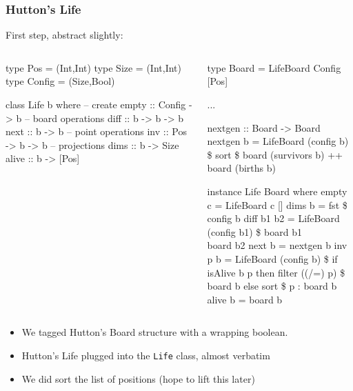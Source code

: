 \documentclass[smaller]{beamer}
\begin{document}
\begin{frame}[fragile]
\frametitle{Hutton's Life}
First step, abstract slightly:

\begin{columns}
\begin{column}{0.5\textwidth}

\begin{codeblock}
\tiny
\begin{semiverbatim}
type Pos = (Int,Int)
type Size = (Int,Int)
type Config = (Size,Bool)

class Life b where
        -- create
        empty :: Config -> b
        -- board operations
        diff :: b -> b -> b
        next :: b -> b
        -- point operations
        inv :: Pos -> b -> b
        -- projections
        dims :: b -> Size
        alive :: b -> [Pos]
\end{semiverbatim}
\end{codeblock}


\end{column}
\begin{column}{0.5\textwidth}
\begin{codeblock}
\tiny
\begin{semiverbatim}
type Board = LifeBoard Config [Pos]

...

nextgen :: Board -> Board
nextgen b = LifeBoard (config b) \$ sort
          \$ board (survivors b) ++ board (births b)

instance Life Board where
  empty c = LifeBoard c []
  dims b = fst \$ config b
  diff b1 b2 = LifeBoard (config b1)
             \$ board b1 \\ board b2
  next b = nextgen b
  inv p b = LifeBoard (config b) \$
    if isAlive b p
    then filter ((/=) p) \$ board b
    else sort \$ p : board b
  alive b = board b
\end{semiverbatim}
\end{codeblock}


\end{column}

\end{columns}

\begin{itemize}
\item We tagged Hutton's Board structure with a wrapping boolean.
\item Hutton's Life plugged into the \verb|Life| class, almost verbatim
\item We did sort the list of positions (hope to lift this later)
\end{itemize}

\end{frame}
\end{document}
